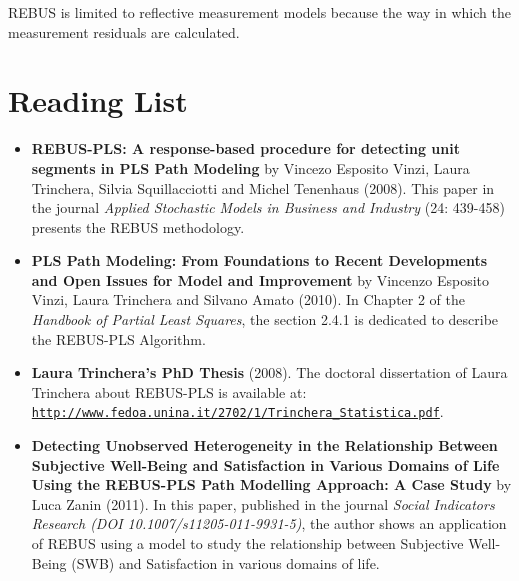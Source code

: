 \documentclass[12pt]{book}\usepackage{graphicx, color}
\begin{document}
REBUS is limited to reflective measurement models because the way in which the measurement residuals are calculated.




\section{Reading List}
\begin{itemize}
 \vspace{2mm}
 \item \textsf{\textbf{REBUS-PLS: A response-based procedure for detecting unit segments in PLS Path Modeling}} by Vincezo Esposito Vinzi, Laura Trinchera, Silvia Squillacciotti and Michel Tenenhaus (2008). This paper in the journal \textit{Applied Stochastic Models in Business and Industry} (24: 439-458) presents the REBUS methodology.
 
 \vspace{2mm}
 \item \textsf{\textbf{PLS Path Modeling: From Foundations to Recent Developments and Open Issues for Model and Improvement}} by Vincenzo Esposito Vinzi, Laura Trinchera and Silvano Amato (2010). In Chapter 2 of the \textit{Handbook of Partial Least Squares}, the section 2.4.1 is dedicated to describe the REBUS-PLS Algorithm.

 \vspace{2mm}
 \item \textsf{\textbf{Laura Trinchera's PhD Thesis}} (2008). The doctoral dissertation of Laura Trinchera about REBUS-PLS is available at: \\ \texttt{\href{http://www.fedoa.unina.it/2702/1/Trinchera_Statistica.pdf}{http://www.fedoa.unina.it/2702/1/Trinchera\_Statistica.pdf}}. 

 \vspace{2mm}
 \item \textsf{\textbf{Detecting Unobserved Heterogeneity in the Relationship Between Subjective Well-Being and Satisfaction in Various Domains of Life Using the REBUS-PLS Path Modelling Approach: A Case Study}} by Luca Zanin (2011). In this paper, published in the journal \textit{Social Indicators Research (DOI 10.1007/s11205-011-9931-5)}, the author shows an application of REBUS using a model to study the relationship between Subjective Well-Being (SWB) and Satisfaction in various domains of life. 
\end{itemize}
\end{document}
